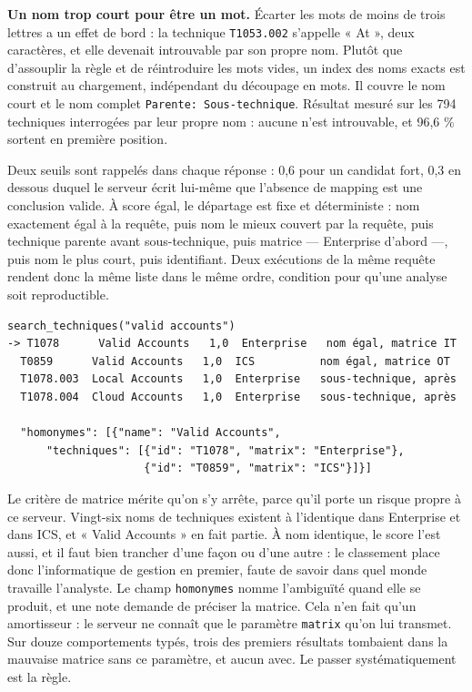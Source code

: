 \textbf{Un nom trop court pour être un mot.} Écarter les mots de moins de trois lettres a un effet de bord : la technique \texttt{T1053.002} s'appelle « At », deux caractères, et elle devenait introuvable par son propre nom. Plutôt que d'assouplir la règle et de réintroduire les mots vides, un index des noms exacts est construit au chargement, indépendant du découpage en mots. Il couvre le nom court et le nom complet \texttt{Parente:\ Sous-technique}. Résultat mesuré sur les 794 techniques interrogées par leur propre nom : aucune n'est introuvable, et 96,6 \% sortent en première position.

Deux seuils sont rappelés dans chaque réponse : 0,6 pour un candidat fort, 0,3 en dessous duquel le serveur écrit lui-même que l'absence de mapping est une conclusion valide. À score égal, le départage est fixe et déterministe : nom exactement égal à la requête, puis nom le mieux couvert par la requête, puis technique parente avant sous-technique, puis matrice --- Enterprise d'abord ---, puis nom le plus court, puis identifiant. Deux exécutions de la même requête rendent donc la même liste dans le même ordre, condition pour qu'une analyse soit reproductible.

\begin{verbatim}
search_techniques("valid accounts")
-> T1078      Valid Accounts   1,0  Enterprise   nom égal, matrice IT
  T0859      Valid Accounts   1,0  ICS          nom égal, matrice OT
  T1078.003  Local Accounts   1,0  Enterprise   sous-technique, après
  T1078.004  Cloud Accounts   1,0  Enterprise   sous-technique, après

  "homonymes": [{"name": "Valid Accounts",
      "techniques": [{"id": "T1078", "matrix": "Enterprise"},
                     {"id": "T0859", "matrix": "ICS"}]}]
\end{verbatim}

Le critère de matrice mérite qu'on s'y arrête, parce qu'il porte un risque propre à ce serveur. Vingt-six noms de techniques existent à l'identique dans Enterprise et dans ICS, et « Valid Accounts » en fait partie. À nom identique, le score l'est aussi, et il faut bien trancher d'une façon ou d'une autre : le classement place donc l'informatique de gestion en premier, faute de savoir dans quel monde travaille l'analyste. Le champ \texttt{homonymes} nomme l'ambiguïté quand elle se produit, et une note demande de préciser la matrice. Cela n'en fait qu'un amortisseur : le serveur ne connaît que le paramètre \texttt{matrix} qu'on lui transmet. Sur douze comportements typés, trois des premiers résultats tombaient dans la mauvaise matrice sans ce paramètre, et aucun avec. Le passer systématiquement est la règle.

